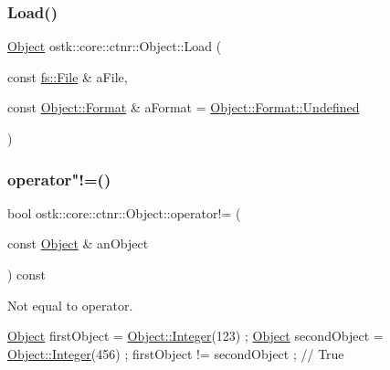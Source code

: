\subsubsection{\texorpdfstring{Load()}{Load()}}
{\footnotesize\ttfamily \hyperlink{classostk_1_1core_1_1ctnr_1_1_object}{Object} ostk\+::core\+::ctnr\+::\+Object\+::\+Load (\begin{DoxyParamCaption}\item[{const \hyperlink{classostk_1_1core_1_1fs_1_1_file}{fs\+::\+File} \&}]{a\+File,  }\item[{const \hyperlink{classostk_1_1core_1_1ctnr_1_1_object_a3266b14cf7e3df39858f6572120e3b24}{Object\+::\+Format} \&}]{a\+Format = {\ttfamily \hyperlink{classostk_1_1core_1_1ctnr_1_1_object_a3266b14cf7e3df39858f6572120e3b24aec0fc0100c4fc1ce4eea230c3dc10360}{Object\+::\+Format\+::\+Undefined}} }\end{DoxyParamCaption})\hspace{0.3cm}{\ttfamily [static]}}

\mbox{\label{classostk_1_1core_1_1ctnr_1_1_object_a3f760f25ffa6bb088fcb66b7ac778572}} 
\subsubsection{\texorpdfstring{operator"!=()}{operator!=()}}
{\footnotesize\ttfamily bool ostk\+::core\+::ctnr\+::\+Object\+::operator!= (\begin{DoxyParamCaption}\item[{const \hyperlink{classostk_1_1core_1_1ctnr_1_1_object}{Object} \&}]{an\+Object }\end{DoxyParamCaption}) const}



Not equal to operator. 


\begin{DoxyCode}
\hyperlink{classostk_1_1core_1_1ctnr_1_1_object_a8e5ab6d15d9e28f3e2c65572f22aeb74}{Object} firstObject = \hyperlink{classostk_1_1core_1_1ctnr_1_1_object_af3bef3ae331e8e55662bf91a4cd5026f}{Object::Integer}(123) ;
\hyperlink{classostk_1_1core_1_1ctnr_1_1_object_a8e5ab6d15d9e28f3e2c65572f22aeb74}{Object} secondObject = \hyperlink{classostk_1_1core_1_1ctnr_1_1_object_af3bef3ae331e8e55662bf91a4cd5026f}{Object::Integer}(456) ;
firstObject != secondObject ; \textcolor{comment}{// True}
\end{DoxyCode}



